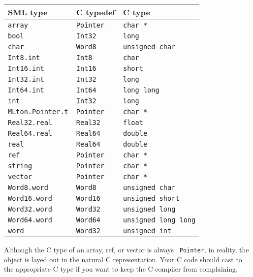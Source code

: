 \begin{center}
\begin{tabular}{l|l|l}
SML type & C typedef & C type\\
\hline
{\tt array} & {\tt Pointer} & {\tt char *} \\
{\tt bool} & {\tt Int32} & {\tt long} \\
{\tt char} & {\tt Word8} & {\tt unsigned char} \\
{\tt Int8.int} & {\tt Int8} & {\tt char} \\
{\tt Int16.int} & {\tt Int16} & {\tt short} \\
{\tt Int32.int} & {\tt Int32} & {\tt long} \\
{\tt Int64.int} & {\tt Int64} & {\tt long long} \\
{\tt int} & {\tt Int32} & {\tt long} \\
{\tt MLton.Pointer.t} & {\tt Pointer} & {\tt char *} \\
{\tt Real32.real} & {\tt Real32} & {\tt float} \\
{\tt Real64.real} & {\tt Real64} & {\tt double} \\
{\tt real} & {\tt Real64} & {\tt double} \\
{\tt ref} & {\tt Pointer} & {\tt char *} \\
{\tt string} & {\tt Pointer} & {\tt char *} \\
{\tt vector} & {\tt Pointer} & {\tt char *} \\
{\tt Word8.word} & {\tt Word8} & {\tt unsigned char} \\
{\tt Word16.word} & {\tt Word16} & {\tt unsigned short} \\
{\tt Word32.word} & {\tt Word32} & {\tt unsigned long} \\
{\tt Word64.word} & {\tt Word64} & {\tt unsigned long long} \\
{\tt word} & {\tt Word32} & {\tt unsigned int} \\
\end{tabular}
\end{center}

Although the C type of an array, ref, or vector is always {\tt
Pointer}, in reality, the object is layed out in the natural C
representation.  Your C code should cast to the appropriate C type if
you want to keep the C compiler from complaining.

